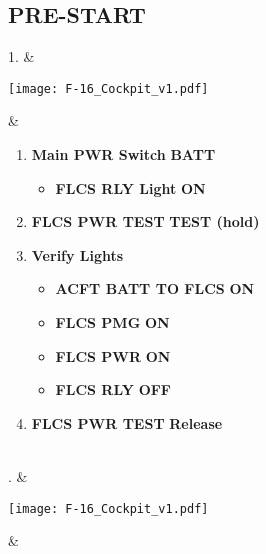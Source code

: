 \documentclass[fontInter]{TechCheck}
\begin{document}
	\subsection{PRE-START}
	\begin{listlongtable}
		1. & 
		\begin{minipage}[t]{\linewidth}
			\vspace{-7pt}
			\centering
			\texttt{[image: F-16\_Cockpit\_v1.pdf]}
		\end{minipage} &
		\begin{minipage}[t]{\linewidth}
			\vspace{-7pt}
			\begin{enumerate}
				\item \textbf{Main PWR Switch} \dotfill \textbf{BATT}
				\begin{itemize}
					\item \textbf{FLCS RLY Light} \dotfill \textbf{ON}
				\end{itemize}
				\item \textbf{FLCS PWR TEST} \dotfill \textbf{TEST (hold)}
				\item \textbf{Verify Lights}
				\begin{itemize}
					\item \textbf{ACFT BATT TO FLCS} \dotfill \textbf{ON}
					\item \textbf{FLCS PMG} \dotfill \textbf{ON}
					\item \textbf{FLCS PWR} \dotfill \textbf{ON}
					\item \textbf{FLCS RLY} \dotfill \textbf{OFF}
				\end{itemize}
				\item \textbf{FLCS PWR TEST} \dotfill \textbf{Release}
			\end{enumerate}
		\end{minipage} \\
		. & 
		\begin{minipage}[t]{\linewidth}
			\vspace{-7pt}
			\centering
			\texttt{[image: F-16\_Cockpit\_v1.pdf]}
		\end{minipage} &
		\begin{minipage}[t]{\linewidth}
			\vspace{-7pt}
			\begin{enumerate}

\end{enumerate}
\end{minipage}
\end{listlongtable}
\end{document}
